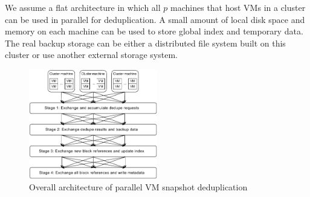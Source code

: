 \begin{itemize}

\end{itemize}


We assume a flat architecture in which  all $p$ machines that host VMs in a cluster can 
be used in parallel for deduplication. 
A small amount of local disk space and memory on each machine can be used 
to store global index and temporary data. 
The real backup storage can be either a distributed file system built on
this cluster  or use another  external storage system. 



\begin{figure}
\centering
\includegraphics[width=0.5\textwidth]{images/batch_arch.pdf}
\caption{Overall architecture of parallel VM snapshot deduplication}
\label{fig:snapshot}
\end{figure}

